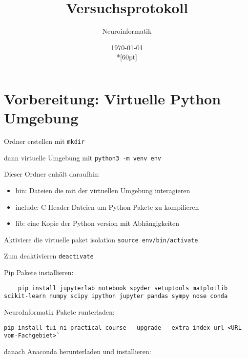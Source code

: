 \documentclass[a4paper,10pt,titlepage]{scrartcl}
\begin{document}
\titlehead
{
    \small
    {
        Technische Universität Ilmenau\\
        Fakulät IA\\
        Fachgebiet Neuroninformatik\\

        Praktikum Neuroinformatik\\
        WS 2021/22}
}

\title {Versuchsprotokoll}
\subtitle{Neuroinformatik}
\author{}
\date{\today\\*[60pt]}
\maketitle

\pagestyle{fancy}
\newpage

\section{Vorbereitung: Virtuelle Python Umgebung}
Ordner erstellen mit \lstinline{mkdir}

dann virtuelle Umgebung mit \lstinline{python3 -m venv env}

Dieser Ordner enhält daraufhin:
\begin{itemize}
    \item bin: Dateien die mit der virtuellen Umgebung interagieren
    \item include: C Header Dateien um Python Pakete zu kompilieren
    \item lib: eine Kopie der Python version mit Abhängigkeiten
\end{itemize}

Aktiviere die virtuelle paket isolation \lstinline{source env/bin/activate}

Zum deaktivieren \lstinline{deactivate}

Pip Pakete installieren: 
\begin{lstlisting}
    pip install jupyterlab notebook spyder setuptools matplotlib scikit-learn numpy scipy ipython jupyter pandas sympy nose conda
\end{lstlisting}

NeuroInformatik Pakete runterladen: 

\lstinline{pip install tui-ni-practical-course --upgrade --extra-index-url <URL-vom-Fachgebiet>`}

danach Anaconda herunterladen und installieren: 
\end{document}
